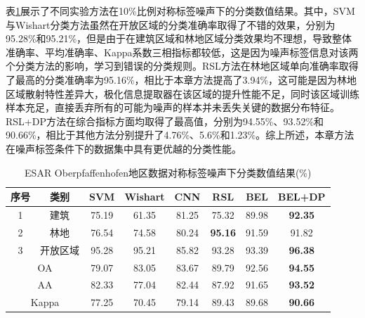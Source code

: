 表\ref{tab:ober_res_4}展示了不同实验方法在10\%比例对称标签噪声下的分类数值结果。其中，SVM与Wishart分类方法虽然在开放区域的分类准确率取得了不错的效果，分别为95.28\%和95.21\%，但是由于在建筑区域和林地区域分类效果均不理想，导致整体准确率、平均准确率、Kappa系数三相指标都较低，这是因为噪声标签信息对该两个分类方法的影响，学习到错误的分类规则。RSL方法在林地区域单向准确率取得了最高的分类准确率为95.16\%，相比于本章方法提高了3.94\%，这可能是因为林地区域散射特性差异大，极化信息提取器在该区域的提升性能不足，同时该区域训练样本充足，直接丢弃所有的可能为噪声的样本并未丢失关键的数据分布特征。RSL+DP方法在综合指标方面均取得了最高值，分别为94.55\%、93.52\%和90.66\%，相比于其他方法分别提升了4.76\%、5.6\%和1.23\%。综上所述，本章方法在噪声标签条件下的数据集中具有更优越的分类性能。

\begin{table}[ht!]
    \caption{ESAR Oberpfaffenhofen地区数据对称标签噪声下分类数值结果(\%)}
    \label{tab:ober_res_4}
    \begin{tabular}{cccccccc}
        \toprule[1.5bp]
        序号                        & 类别    & SVM   & Wishart & CNN   & RSL            & BEL            & BEL+DP         \\
        \midrule[0.75bp]
        1                         & 建筑    & 75.19 & 61.35   & 81.25 & 75.32          & 89.98          & \textbf{92.35} \\
        2                         & 林地    & 76.54 & 74.58   & 80.24 & \textbf{95.16} & 91.59          & 91.82          \\
        3                         & 开放区域  & 95.28 & 95.21   & 85.82 & 93.28          & 93.39          & \textbf{96.38} \\
        \midrule[0.75bp]
        \multicolumn{2}{c}{OA}    & 79.07 & 83.05 & 83.67   & 89.79 & 92.56          & \textbf{94.55}                  \\
        \multicolumn{2}{c}{AA}    & 82.33 & 77.04 & 82.44   & 87.92 & 91.65          & \textbf{93.52}                  \\
        \multicolumn{2}{c}{Kappa} & 77.25 & 70.45 & 79.14   & 89.43 & 89.68          & \textbf{90.66}                  \\
        \bottomrule[0.75bp]
    \end{tabular}
\end{table}


